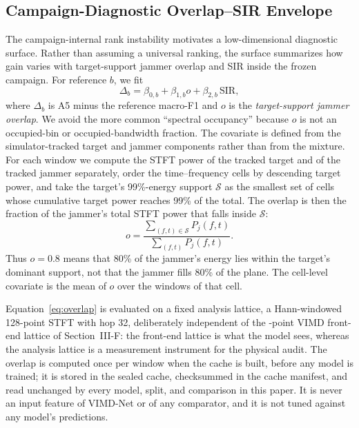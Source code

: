 \documentclass[letterpaper,journal]{IEEEtran}
\begin{document}
\subsection{Campaign-Diagnostic Overlap--SIR Envelope}
The campaign-internal rank instability motivates a low-dimensional diagnostic
surface. Rather than assuming a universal ranking, the surface summarizes how
gain varies with target-support jammer overlap and SIR inside the frozen
campaign. For reference $b$, we fit
\begin{equation}
\Delta_b=\beta_{0,b}+\beta_{1,b}o+\beta_{2,b}\,\mathrm{SIR},
\label{eq:envelope}
\end{equation}
where $\Delta_b$ is A5 minus the reference macro-F1 and $o$ is the
\emph{target-support jammer overlap}. We avoid the more common ``spectral
occupancy'' because $o$ is not an occupied-bin or occupied-bandwidth fraction.
The covariate is defined from the simulator-tracked target and jammer
components rather than from the mixture. For each window we compute the STFT
power of the tracked target and of the tracked jammer separately, order the
time--frequency cells by descending target power, and take the target's
99\%-energy support $\mathcal{S}$ as the smallest set of cells whose cumulative
target power reaches 99\% of the total. The overlap is then the fraction of the
jammer's total STFT power that falls inside $\mathcal{S}$:
\begin{equation}
o=\frac{\sum_{(f,t)\in\mathcal{S}}P_j(f,t)}{\sum_{(f,t)}P_j(f,t)}.
\label{eq:overlap}
\end{equation}
Thus $o=0.8$ means that 80\% of the jammer's energy lies within the target's
dominant support, not that the jammer fills 80\% of the plane. The cell-level
covariate is the mean of $o$ over the windows of that cell.

Equation~\eqref{eq:overlap} is evaluated on a fixed analysis lattice, a
Hann-windowed 128-point STFT with hop 32, deliberately independent of the
\NFft-point VIMD front-end lattice of Section~III-F: the front-end lattice is
what the model sees, whereas the analysis lattice is a measurement instrument
for the physical audit. The overlap is computed once per window when the cache
is built, before any model is trained; it is stored in the sealed cache,
checksummed in the cache manifest, and read unchanged by every model, split,
and comparison in this paper. It is never an
input feature of VIMD-Net or of any comparator, and it is not tuned against any
model's predictions.
\end{document}
